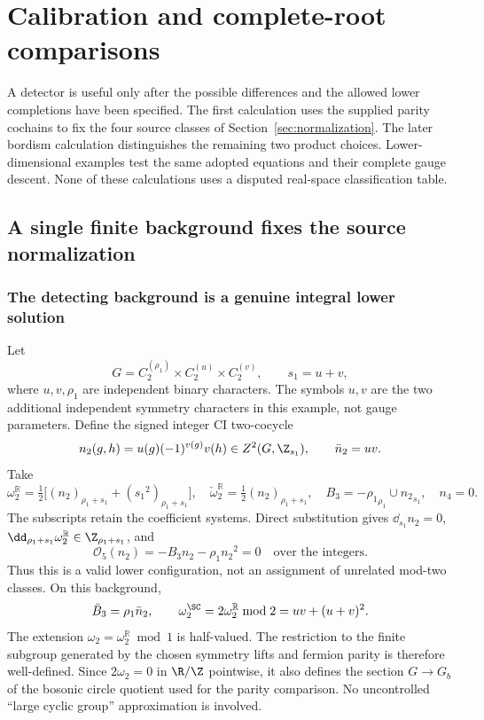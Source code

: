 \section{Calibration and complete-root comparisons}\label{sec:examples}
A detector is useful only after the possible differences and the allowed lower completions have been specified. The first calculation uses the supplied parity cochains to fix the four source classes of Section~\ref{sec:normalization}. The later bordism calculation distinguishes the remaining two product choices. Lower-dimensional examples test the same adopted equations and their complete gauge descent. None of these calculations uses a disputed real-space classification table.

\subsection{A single finite background fixes the source normalization}\label{subsec:finite-calibration}\label{sec:calibration04}
\subsubsection{The detecting background is a genuine integral lower solution}
Let
\begin{equation}\label{eq:detectG04}
G=C_2^{({\rho_1})}\times C_2^{(u)}\times C_2^{(v)},\qquad {s_1}=u+v,
\end{equation}
where $u,v,{\rho_1}$ are independent binary characters. The symbols $u,v$ are the two additional independent symmetry characters in this example, not gauge parameters. Define the signed integer CI two-cocycle
\begin{equation}\label{eq:detectk04}
{n_2}(g,h)=u(g)(-1)^{v(g)}v(h)\in Z^2(G,\Z_{s_1}),\qquad \bar n_2=uv.
\end{equation}
Take
\begin{equation}\label{eq:detecta04}
\boxed{\omega_2^{\mathbb R}=\tfrac12\bigl[({n_2})_{\rho_1+s_1}+({s_1}^2)_{\rho_1+s_1}\bigr],\quad
\check\omega_2^{\mathbb R}=\tfrac12({n_2})_{\rho_1+s_1},\quad B_3=-{\rho_1}_{\rho_1}\cup {n_2}_{s_1},\quad n_4=0.}
\end{equation}
The subscripts retain the coefficient systems. Direct substitution gives $\dd_{s_1}{n_2}=0$, $\dd_{\rho_1+s_1}\omega_2^{\mathbb R}\in\Z_{\rho_1+s_1}$, and
\begin{equation}
\mathcal O_5({n_2})=-B_3{n_2}-{\rho_1}{n_2}^2=0\quad\text{over the integers}.
\end{equation}
Thus this is a valid lower configuration, not an assignment of unrelated mod-two classes. On this background,
\begin{equation}
\bar B_3={\rho_1}{\bar n_2},\qquad \omega_2^{\SC}=2\omega_2^{\mathbb R}\bmod2=uv+(u+v)^2.
\end{equation}
The extension $\omega_2=\omega_2^{\mathbb R}\bmod1$ is half-valued. The restriction to the finite subgroup generated by the chosen symmetry lifts and fermion parity is therefore well-defined. Since $2\omega_2=0$ in $\R/\Z$ pointwise, it also defines the section $G\to G_b$ of the bosonic circle quotient used for the parity comparison. No uncontrolled ``large cyclic group'' approximation is involved.


